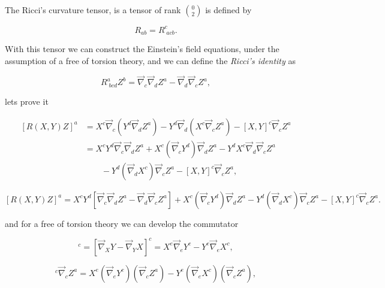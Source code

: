             \begin{myDef}
                The Ricci's curvature tensor, is a tensor of rank $\binom{0}{2}$ is defined by

                \begin{equation}
                    R_{ab}=R^c_{\;acb}.
                \end{equation}
            \end{myDef}

            With this tensor we can construct the Einstein's field equations, under the assumption of a free of torsion theory, and we can define the \textit{Ricci's identity} as

            \begin{equation}
                R^a_{\;bcd}Z^b = \Vec{\nabla}_c\Vec{\nabla}_dZ^a - \Vec{\nabla}_d\Vec{\nabla}_cZ^a,
            \end{equation}

            lets prove it

            \begin{align*}
                \left[R(X,Y)Z\right]^a &= X^c\Vec{\nabla}_c\left(Y^d\Vec{\nabla}_dZ^a \right) - Y^d\Vec{\nabla}_d\left(X^c\Vec{\nabla}_cZ^a \right) - [X,Y]^c\Vec{\nabla}_cZ^a\\
                &= X^cY^d\Vec{\nabla}_c\Vec{\nabla}_dZ^a + X^c\left(\Vec{\nabla}_cY^d\right)\Vec{\nabla}_dZ^a - Y^dX^c\Vec{\nabla}_d\Vec{\nabla}_cZ^a\\
                &\qquad - Y^d\left(\Vec{\nabla}_dX^c \right)\Vec{\nabla}_cZ^a-[X,Y]^c\Vec{\nabla}_cZ^a,
            \end{align*}

            \begin{equation}
                \left[R(X,Y)Z \right]^a = X^cY^d\left[\Vec{\nabla}_c\Vec{\nabla}_dZ^a - \Vec{\nabla}_d\Vec{\nabla}_cZ^a \right] + X^c\left(\Vec{\nabla}_cY^d \right)\Vec{\nabla}_dZ^a - Y^d\left(\Vec{\nabla}_dX^c\right)\Vec{\nabla}_cZ^a - [X,Y]^c\Vec{\nabla}_cZ^a.
            \end{equation}

            and for a free of torsion theory we can develop the commutator

            \begin{equation}
                [X,Y]^c = \left[\Vec{\nabla}_XY - \Vec{\nabla}_YX \right]^c = X^e\Vec{\nabla}_eY^c - Y^e\Vec{\nabla}_eX^c,
            \end{equation}

            \begin{equation}
                [X,Y]^c\Vec{\nabla}_cZ^a = X^e\left(\Vec{\nabla}_eY^c \right)\left(\Vec{\nabla}_cZ^a\right) - Y^e\left(\Vec{\nabla}_eX^c \right)\left(\Vec{\nabla}_cZ^a\right),
            \end{equation}

